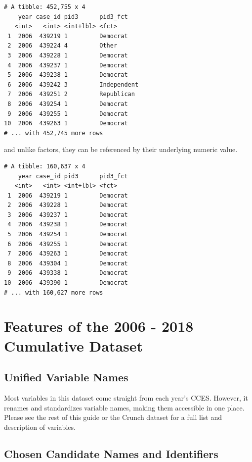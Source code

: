 \documentclass[10pt,article,oneside]{memoir}
\theoremstyle{definition}
\begin{document}
\begin{verbatim}
# A tibble: 452,755 x 4
    year case_id pid3      pid3_fct   
   <int>   <int> <int+lbl> <fct>      
 1  2006  439219 1         Democrat   
 2  2006  439224 4         Other      
 3  2006  439228 1         Democrat   
 4  2006  439237 1         Democrat   
 5  2006  439238 1         Democrat   
 6  2006  439242 3         Independent
 7  2006  439251 2         Republican 
 8  2006  439254 1         Democrat   
 9  2006  439255 1         Democrat   
10  2006  439263 1         Democrat   
# ... with 452,745 more rows
\end{verbatim}

and unlike factors, they can be referenced by their underlying numeric
value.

\begin{verbatim}
# A tibble: 160,637 x 4
    year case_id pid3      pid3_fct
   <int>   <int> <int+lbl> <fct>   
 1  2006  439219 1         Democrat
 2  2006  439228 1         Democrat
 3  2006  439237 1         Democrat
 4  2006  439238 1         Democrat
 5  2006  439254 1         Democrat
 6  2006  439255 1         Democrat
 7  2006  439263 1         Democrat
 8  2006  439304 1         Democrat
 9  2006  439338 1         Democrat
10  2006  439390 1         Democrat
# ... with 160,627 more rows
\end{verbatim}

\newpage

\section{Features of the 2006 - 2018 Cumulative
Dataset}\label{features-of-the-2006---2018-cumulative-dataset}

\subsection{Unified Variable Names}\label{unified-variable-names}

Most variables in this dataset come straight from each year's CCES.
However, it renames and standardizes variable names, making them
accessible in one place. Please see the rest of this guide or the Crunch
dataset for a full list and description of variables.

\subsection{Chosen Candidate Names and
Identifiers}\label{chosen-candidate-names-and-identifiers}
\end{document}
